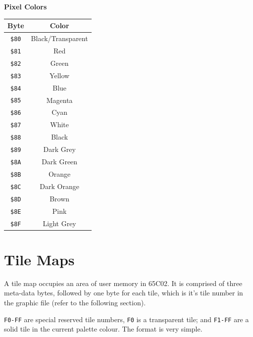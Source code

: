 \documentclass[12pt]{article}
\newcommand{\MonoSp}[1] {\fontsize{10pt}{10pt}\selectfont\texttt{#1}\normalsize}
\begin{document}
\begin{table}[h]
\centering\textbf{Pixel Colors}   \\
\begin{tabular}{ | c | c | }         \hline
\textbf{Byte} & \textbf{Color}    \\ \hline
\MonoSp{\$80} & Black/Transparent \\ \hline
\MonoSp{\$81} & Red               \\ \hline
\MonoSp{\$82} & Green             \\ \hline
\MonoSp{\$83} & Yellow            \\ \hline
\MonoSp{\$84} & Blue              \\ \hline
\MonoSp{\$85} & Magenta           \\ \hline
\MonoSp{\$86} & Cyan              \\ \hline
\MonoSp{\$87} & White             \\ \hline
\MonoSp{\$88} & Black             \\ \hline
\MonoSp{\$89} & Dark Grey         \\ \hline
\MonoSp{\$8A} & Dark Green        \\ \hline
\MonoSp{\$8B} & Orange            \\ \hline
\MonoSp{\$8C} & Dark Orange       \\ \hline
\MonoSp{\$8D} & Brown             \\ \hline
\MonoSp{\$8E} & Pink              \\ \hline
\MonoSp{\$8F} & Light Grey        \\ \hline
\end{tabular}
\end{table}


\pagebreak


\section{Tile Maps}\label{tilemaps}

A tile map occupies an area of user memory in 65C02.
It is comprised of three meta-data bytes, followed by one byte for each tile,
which is it's tile number in the graphic file (refer to the following section).
\newline

\MonoSp{F0-FF} are special reserved tile numbers,
\MonoSp{F0} is a transparent tile;
and \MonoSp{F1-FF} are a solid tile in the current palette colour.
The format is very simple.
\end{document}
